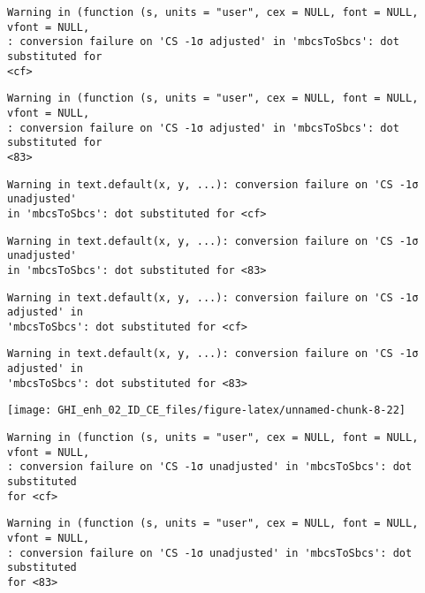 \documentclass[
  10pt,
  a4paper,oneside]{article}
\begin{document}
\begin{verbatim}
Warning in (function (s, units = "user", cex = NULL, font = NULL, vfont = NULL,
: conversion failure on 'CS -1σ adjusted' in 'mbcsToSbcs': dot substituted for
<cf>
\end{verbatim}

\begin{verbatim}
Warning in (function (s, units = "user", cex = NULL, font = NULL, vfont = NULL,
: conversion failure on 'CS -1σ adjusted' in 'mbcsToSbcs': dot substituted for
<83>
\end{verbatim}

\begin{verbatim}
Warning in text.default(x, y, ...): conversion failure on 'CS -1σ unadjusted'
in 'mbcsToSbcs': dot substituted for <cf>
\end{verbatim}

\begin{verbatim}
Warning in text.default(x, y, ...): conversion failure on 'CS -1σ unadjusted'
in 'mbcsToSbcs': dot substituted for <83>
\end{verbatim}

\begin{verbatim}
Warning in text.default(x, y, ...): conversion failure on 'CS -1σ adjusted' in
'mbcsToSbcs': dot substituted for <cf>
\end{verbatim}

\begin{verbatim}
Warning in text.default(x, y, ...): conversion failure on 'CS -1σ adjusted' in
'mbcsToSbcs': dot substituted for <83>
\end{verbatim}

\begin{center}\texttt{[image: GHI\_enh\_02\_ID\_CE\_files/figure-latex/unnamed-chunk-8-22]} \end{center}

\begin{verbatim}
Warning in (function (s, units = "user", cex = NULL, font = NULL, vfont = NULL,
: conversion failure on 'CS -1σ unadjusted' in 'mbcsToSbcs': dot substituted
for <cf>
\end{verbatim}

\begin{verbatim}
Warning in (function (s, units = "user", cex = NULL, font = NULL, vfont = NULL,
: conversion failure on 'CS -1σ unadjusted' in 'mbcsToSbcs': dot substituted
for <83>
\end{verbatim}
\end{document}

